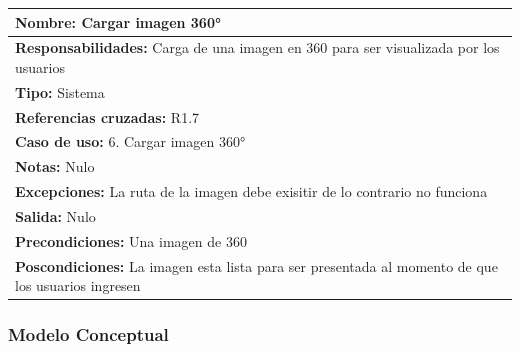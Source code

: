 \begin{table}[H]
    \begin{center}
        \begin{tabular}{| m{15cm} |}          
        	\hline 
        	\textbf{Nombre:} Cargar imagen 360°\\
        	\hline
        	\textbf{Responsabilidades:} Carga de una imagen en 360 para ser visualizada por los usuarios\\
        	\hline
        	\textbf{Tipo:} Sistema\\
        	\hline
        	\textbf{Referencias cruzadas:} R1.7\\
        	\hline
        	\textbf{Caso de uso:} 6. Cargar imagen 360°\\
        	\hline
        	\textbf{Notas:} Nulo\\
        	\hline
        	\textbf{Excepciones:} La ruta de la imagen debe exisitir de lo contrario no funciona\\
        	\hline
        	\textbf{Salida:} Nulo\\
        	\hline
        	\textbf{Precondiciones:} Una imagen de 360 \\
        	\hline
        	\textbf{Poscondiciones:} La imagen esta lista para ser presentada al momento de que los usuarios ingresen\\
        	\hline
        \end{tabular}
    \end{center}
\end{table}

\subsubsection{Modelo Conceptual}

